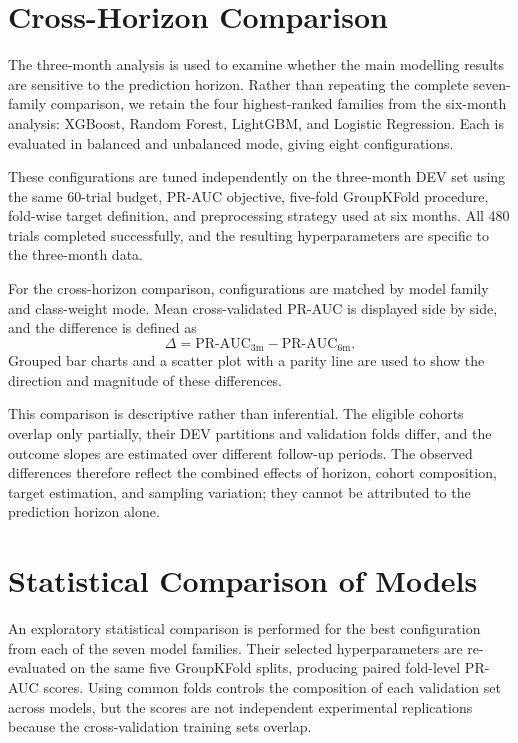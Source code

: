 \section{Cross-Horizon Comparison}
\label{sec:methods_cross_horizon}
The three-month analysis is used to examine whether the main modelling results are sensitive to the prediction horizon. Rather than repeating the complete seven-family comparison, we retain the four highest-ranked families from the six-month analysis: XGBoost, Random Forest, LightGBM, and Logistic Regression. Each is evaluated in balanced and unbalanced mode, giving eight configurations.

These configurations are tuned independently on the three-month DEV set using the same 60-trial budget, \gls{PR-AUC} objective, five-fold GroupKFold procedure, fold-wise target definition, and preprocessing strategy used at six months. All 480 trials completed successfully, and the resulting hyperparameters are specific to the three-month data.

For the cross-horizon comparison, configurations are matched by model family and class-weight mode. Mean cross-validated \gls{PR-AUC} is displayed side by side, and the difference is defined as
\[
\Delta = \text{PR-AUC}_{3\text{m}} - \text{PR-AUC}_{6\text{m}}.
\]
Grouped bar charts and a scatter plot with a parity line are used to show the direction and magnitude of these differences.

This comparison is descriptive rather than inferential. The eligible cohorts overlap only partially, their DEV partitions and validation folds differ, and the outcome slopes are estimated over different follow-up periods. The observed differences therefore reflect the combined effects of horizon, cohort composition, target estimation, and sampling variation; they cannot be attributed to the prediction horizon alone.

\section{Statistical Comparison of Models}
\label{sec:methods_statistical_comparison}
An exploratory statistical comparison is performed for the best configuration from each of the seven model families. Their selected hyperparameters are re-evaluated on the same five GroupKFold splits, producing paired fold-level \gls{PR-AUC} scores. Using common folds controls the composition of each validation set across models, but the scores are not independent experimental replications because the cross-validation training sets overlap.

